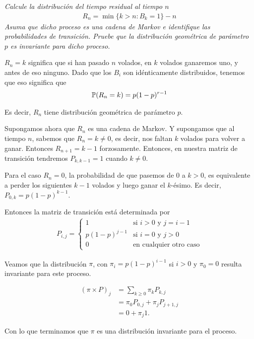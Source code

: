 \emph{
    Calcule la distribución del tiempo residual al tiempo $n$
        \begin{align}
                R_n = \min\{k > n: B_k = 1\} - n
        \end{align}
    Asuma que dicho proceso es una cadena de Markov e identifique las probabilidades de transición.
    Pruebe que la distribución geométrica de parámetro $p$ es invariante para dicho proceso.
}

\afterstatement\pn

$R_n = k$ significa que si han pasado $n$ volados, en $k$ volados ganaremos uno, y antes de eso ninguno.
Dado que los $B_i$ son idénticamente distribuidos, tenemos que eso significa que
\begin{align}
        \P(R_n = k) = p (1-p)^{r-1}        
\end{align}\pn

Es decir, $R_n$ tiene distribución geométrica de parámetro $p$.\pn

Supongamos ahora que $R_n$ es una cadena de Markov. Y supongamos que al tiempo $n$, sabemos que
$R_n = k \neq 0$, es decir, nos faltan $k$ volados para volver a ganar. Entonces $R_{n+1} = k-1$ forzosamente.\pn
Entonces, en nuestra matriz de transición tendremos $P_{k, k-1} = 1$ cuando $k \neq 0$.\pn

Para el caso $R_n = 0$, la probabilidad de que pasemos de $0$ a $k>0$, es equivalente a perder los siguientes $k-1$ volados y luego
ganar el $k$-ésimo. Es decir, $P_{0, k} = p (1-p)^{k-1}$.\pn

Entonces la matriz de transición está determinada por
\begin{align}
        P_{i,j} =
                    \begin{cases}
                        1               &   \text{si $i > 0$ y $j = i - 1$}     \\
                        p (1-p)^{j-1}   &   \text{si $i = 0$ y $j>0$}           \\
                        0               &   \text{en cualquier otro caso}
                    \end{cases}
\end{align}\pn

Veamos que la distribución $\pi$, con $\pi_i = p (1-p)^{i-1}$ si $i>0$ y $\pi_0 = 0$ resulta invariante para este proceso.

\begin{align}
        (\pi \times P)_{j}      &=  \sum_{k \geq 0} \pi_{k} P_{k,j}     \\
                                &=  \pi_0 P_{0, j} + \pi_{j} P_{j+1, j} \\
                                &=  0 + \pi_{j} 1.
\end{align}\pn

Con lo que terminamos que $\pi$ es una distribución invariante para el proceso.
